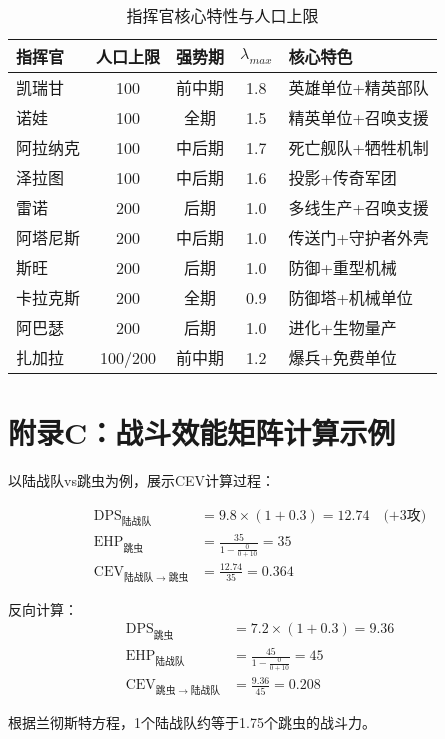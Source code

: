 \documentclass[a4paper,12pt]{article}
\begin{document}
\begin{table}[h]
\centering
\caption{指挥官核心特性与人口上限}
\small
\begin{tabular}{lcccl}
\toprule
\textbf{指挥官} & \textbf{人口上限} & \textbf{强势期} & \textbf{$\lambda_{max}$} & \textbf{核心特色} \\
\midrule
凯瑞甘 & 100 & 前中期 & 1.8 & 英雄单位+精英部队 \\
诺娃 & 100 & 全期 & 1.5 & 精英单位+召唤支援 \\
阿拉纳克 & 100 & 中后期 & 1.7 & 死亡舰队+牺牲机制 \\
泽拉图 & 100 & 中后期 & 1.6 & 投影+传奇军团 \\
雷诺 & 200 & 后期 & 1.0 & 多线生产+召唤支援 \\
阿塔尼斯 & 200 & 中后期 & 1.0 & 传送门+守护者外壳 \\
斯旺 & 200 & 后期 & 1.0 & 防御+重型机械 \\
卡拉克斯 & 200 & 全期 & 0.9 & 防御塔+机械单位 \\
阿巴瑟 & 200 & 后期 & 1.0 & 进化+生物量产 \\
扎加拉 & 100/200 & 前中期 & 1.2 & 爆兵+免费单位 \\
\bottomrule
\end{tabular}
\end{table}

\section{附录C：战斗效能矩阵计算示例}

以陆战队vs跳虫为例，展示CEV计算过程：

\begin{align}
\text{DPS}_{陆战队} &= 9.8 \times (1 + 0.3) = 12.74 \quad \text{(+3攻)} \\
\text{EHP}_{跳虫} &= \frac{35}{1 - \frac{0}{0 + 10}} = 35 \\
\text{CEV}_{陆战队 \rightarrow 跳虫} &= \frac{12.74}{35} = 0.364
\end{align}

反向计算：
\begin{align}
\text{DPS}_{跳虫} &= 7.2 \times (1 + 0.3) = 9.36 \\
\text{EHP}_{陆战队} &= \frac{45}{1 - \frac{0}{0 + 10}} = 45 \\
\text{CEV}_{跳虫 \rightarrow 陆战队} &= \frac{9.36}{45} = 0.208
\end{align}

根据兰彻斯特方程，1个陆战队约等于1.75个跳虫的战斗力。
\end{document}
